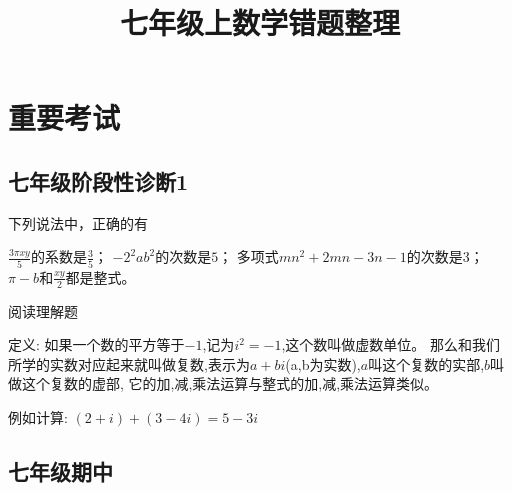 \documentclass[answers]{exam}
\title{七年级上数学错题整理}
\begin{document}
\maketitle

\section{重要考试}

\subsection{七年级阶段性诊断1}

\begin{questions}
\question
下列说法中，正确的有\fillin
  
\begin{oneparchoices}
  \choice $\frac{3 \pi xy}{5}$的系数是$\frac{3}{5}$；
  \correctchoice $-2^2ab^2$的次数是$5$；
  \choice 多项式$mn^2+2mn-3n-1$的次数是$3$；
  \choice $\pi - b$和$\frac{xy}{2}$都是整式。
\end{oneparchoices}

\question
阅读理解题

定义:
如果一个数的平方等于$-1$,记为$i^2=-1$,这个数叫做虚数单位。
那么和我们所学的实数对应起来就叫做复数,表示为$a+bi$(a,b为实数),$a$叫这个复数的实部,$b$叫做这个复数的虚部,
它的加,减,乘法运算与整式的加,减,乘法运算类似。

例如计算: $(2+i) + (3-4i)=5-3i$


\end{questions}

\subsection{七年级期中} 
\end{document}
